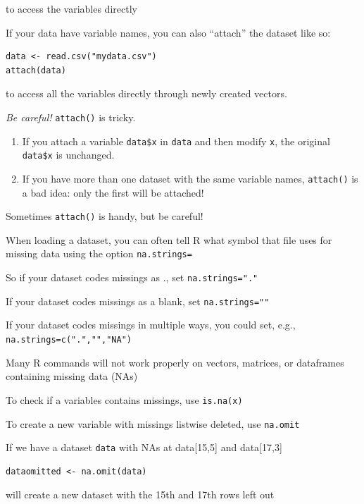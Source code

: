 \documentclass[pdflatex,landscape,titlepage]{foils}
\begin{document}
to access the variables directly




If your data have variable names, you can also ``attach'' the dataset like so:

\begin{verbatim}
data <- read.csv("mydata.csv")
attach(data)
\end{verbatim}

to access all the variables directly through newly created vectors.


\emph{Be careful!}  \texttt{attach()} is tricky.

\begin{enumerate}
\item If you attach a variable \texttt{data\$x} in \texttt{data} and
  then modify \texttt{x}, the original \texttt{data\$x} is unchanged.

\item  If you have more than one dataset with the same variable names,
  \texttt{attach()} is a bad idea:  only the first will be attached!

\end{enumerate}

Sometimes \texttt{attach()} is handy, but be careful!



When loading a dataset, you can often tell R what symbol that file uses for missing data using the option \texttt{na.strings=}

So if your dataset codes missings as ., set \texttt{na.strings="."}

If your dataset codes missings as a blank, set \texttt{na.strings=""}

If your dataset codes missings in multiple ways, you could set, e.g., \texttt{na.strings=c(".","","NA")}


Many R commands will not work properly on vectors, matrices, or dataframes containing missing data (NAs)

To check if a variables contains missings, use \texttt{is.na(x)}

To create a new variable with missings listwise deleted, use \texttt{na.omit}

If we have a dataset \texttt{data} with NAs at data[15,5] and data[17,3]

\begin{verbatim}
dataomitted <- na.omit(data)
\end{verbatim}
will create a new dataset with the 15th and 17th rows left out
\end{document}
